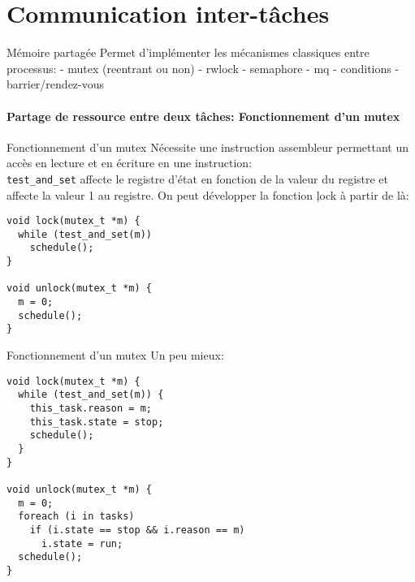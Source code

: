 %
%
%

\part{Communication inter-tâches}

\begin{frame}
\partpage
\end{frame}

\begin{frame}
\tableofcontents[currentpart]
\end{frame}

\begin{frame}[fragile]{Mémoire partagée}
  Permet d'implémenter les mécanismes classiques entre processus:
    - mutex (reentrant ou non)
    - rwlock
    - semaphore
    - mq
    - conditions
    - barrier/rendez-vous
\end{frame}

\subsection{Partage de ressource entre deux tâches: Fonctionnement d'un mutex}

\begin{frame}[fragile]{Fonctionnement d'un mutex}
  Nécessite une instruction assembleur  permettant un accès en lecture
  et en écriture  en une instruction: \\
  \texttt{test\_and\_set} affecte le registre d'état en fonction de la
  valeur  du registre  et affecte  la valeur  1 au  registre.  On peut
  développer la fonction \c{lock} à partir de là:
  \begin{lstlisting} 
void lock(mutex_t *m) {
  while (test_and_set(m))
    schedule();
}

void unlock(mutex_t *m) {
  m = 0;
  schedule();
}
  \end{lstlisting} 
\end{frame}

\begin{frame}[fragile]{Fonctionnement d'un mutex}
  Un peu mieux:
  \begin{lstlisting} 
void lock(mutex_t *m) {
  while (test_and_set(m)) {
    this_task.reason = m;
    this_task.state = stop;
    schedule();
  }
}

void unlock(mutex_t *m) {
  m = 0;
  foreach (i in tasks)
    if (i.state == stop && i.reason == m)
      i.state = run;
  schedule();
}
  \end{lstlisting}
\end{frame} 



